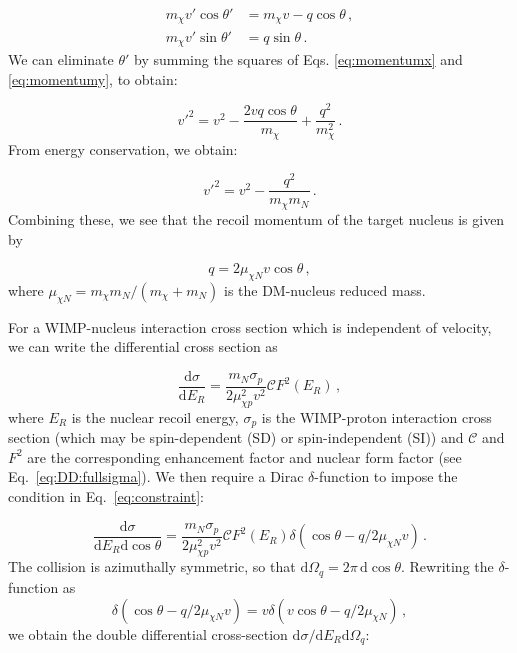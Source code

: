 \begin{align}
m_\chi v' \cos \theta' &= m_\chi v - q\cos \theta \,, \label{eq:momentumx}\\
m_\chi v' \sin \theta' &= q \sin \theta \,. \label{eq:momentumy}
\end{align}
We can eliminate \(\theta'\) by summing the squares of Eqs. \ref{eq:momentumx} and \ref{eq:momentumy}, to obtain:

\begin{equation}
v'^2 = v^2 - \frac{2 v q \cos \theta}{m_\chi} + \frac{q^2}{m_\chi^2}\,.
\end{equation}
From energy conservation, we obtain:

\begin{equation}
\label{eq:Energy}
v'^2 = v^2 - \frac{q^2}{m_\chi m_N} \,.
\end{equation}
Combining these, we see that the recoil momentum of the target nucleus is given by

\begin{equation}
\label{eq:constraint}
q = 2\mu_{\chi N} v \cos \theta \,,
\end{equation}
where \(\mu_{\chi N} = m_\chi m_N/(m_\chi + m_N)\) is the DM-nucleus reduced mass.


For a WIMP-nucleus interaction cross section which is independent of velocity, we can write the differential cross section as

\begin{equation}
\frac{\textrm{d}\sigma}{\textrm{d}E_R} = \frac{m_N \sigma_p}{2 \mu_{\chi p}^2 v^2} \mathcal{C} F^2(E_R)\,,
\end{equation}
where \(E_R\) is the nuclear recoil energy, \(\sigma_p\) is the WIMP-proton interaction cross section (which may be spin-dependent (SD) or spin-independent (SI)) and $\mathcal{C}$ and $F^2$ are the corresponding enhancement factor and nuclear form factor (see Eq.~\ref{eq:DD:fullsigma}). We then require a Dirac \(\delta\)-function to impose the condition in Eq.\ \ref{eq:constraint}:

\begin{equation}
\frac{\textrm{d}\sigma}{\textrm{d}E_R\textrm{d}\cos\theta} = \frac{m_N \sigma_p}{2 \mu_{\chi p}^2 v^2} \mathcal{C} F^2(E_R) \delta\left(\cos\theta - q/2\mu_{\chi N}v\right)\,.
\end{equation}
The collision is azimuthally symmetric, so that \(\textrm{d}\Omega_q = 2\pi\,\textrm{d}\cos\theta\). Rewriting the $\delta$-function as
\begin{equation}
 \delta\left(\cos\theta - q/2\mu_{\chi N}v\right) = v \delta\left(v \cos\theta - q/2\mu_{\chi N}\right)\,,
\end{equation}
we obtain the double differential cross-section \(\textrm{d}\sigma/\textrm{d}E_R \textrm{d}\Omega_q\):

